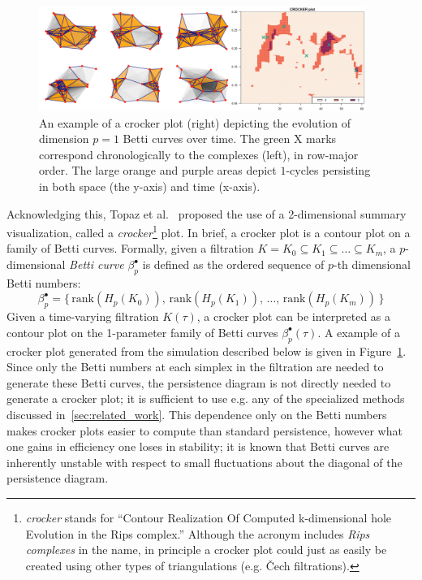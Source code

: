 \documentclass{article} %
\begin{document}
\begin{figure}[t]
	\centering
	\includegraphics[width=0.95\textwidth]{crocker_combo_1.png}
	\caption{An example of a crocker plot (right) depicting the evolution of dimension $p = 1$ Betti curves over time. The green $\mathrm{X}$ marks correspond chronologically to the complexes (left), in row-major order. The large orange and purple areas depict $1$-cycles persisting in both space (the y-axis) and time (x-axis). }\label{fig:crocker1}
\end{figure}

Acknowledging this, Topaz et al.~\cite{topaz2015topological} proposed the use of a 2-dimensional summary visualization, called a \emph{crocker}\footnote{\emph{crocker} stands for ``Contour Realization Of Computed k-dimensional hole Evolution in the Rips complex.'' Although the acronym includes \emph{Rips complexes} in the name, in principle a crocker plot could just as easily be created using other types of triangulations (e.g. \v{C}ech filtrations).} plot. 
In brief, a crocker plot is a contour plot on a family of Betti curves. Formally, given a filtration $K = K_0 \subseteq K_1 \subseteq \dots \subseteq K_m$, a $p$-dimensional \emph{Betti curve} $\beta_p^{\bullet}$ is defined as the ordered sequence of $p$-th dimensional Betti numbers:
$$ \beta_p^\bullet = \{ \, \mathrm{rank}(H_p(K_0)), \, \mathrm{rank}(H_p(K_1)), \, \dots, \, \mathrm{rank}(H_p(K_m))\, \}$$
Given a time-varying filtration $K(\tau)$, a crocker plot can be interpreted as a contour plot on the 1-parameter family of Betti curves $\beta_p^\bullet(\tau)$. A example of a crocker plot generated from the simulation described below is given in Figure~\ref{fig:crocker1}. Since only the Betti numbers at each simplex in the filtration are needed to generate these Betti curves, the persistence diagram is not directly needed to generate a crocker plot; it is sufficient to use e.g. any of the specialized methods discussed in~\ref{sec:related_work}. This dependence only on the Betti numbers makes crocker plots easier to compute than standard persistence, however what one gains in efficiency one loses in stability; it is known that Betti curves are inherently unstable with respect to small fluctuations about the diagonal of the persistence diagram. 
\end{document}

